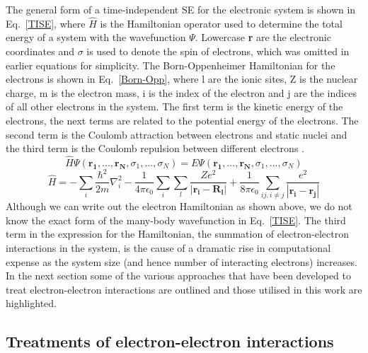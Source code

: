\documentclass[11pt, twoside]{report}
\begin{document}
The general form of a time-independent SE for the electronic system is shown in Eq.~\ref{TISE}, where $\hat{H}$ is the Hamiltonian operator used to determine the total energy of a system with the wavefunction $\Psi$. Lowercase \textbf{r} are the electronic coordinates and $\sigma$ is used to denote the spin of electrons, which was omitted in earlier equations for simplicity. The Born-Oppenheimer Hamiltonian for the electrons is shown in Eq.~\ref{Born-Opp}, where l are the ionic sites, Z is the nuclear charge, m is the electron mass, i is the index of the electron and j are the indices of all other electrons in the system. The first term is the kinetic energy of the electrons, the next terms are related to the potential energy of the electrons. The second term is the Coulomb attraction between electrons and static nuclei and the third term is the Coulomb repulsion between different electrons \cite{Prasad_ch2}.
\begin{equation}\label{TISE}
\hat{H}\Psi(\mathbf{r_1}, ..., \mathbf{r_N}, \sigma_1, ..., \sigma_N) = E\Psi(\mathbf{r_1}, ..., \mathbf{r_N}, \sigma_1, ..., \sigma_N)
\end{equation}
\begin{equation}\label{Born-Opp}
\hat{H} = - \sum_i \frac{\hbar^2}{2m}\nabla_i^2 - \frac{1}{4 \pi \epsilon_0}\sum_i \sum_l \frac{Ze^2}{|\mathbf{r_i}-\mathbf{R_l}|} + \frac{1}{8 \pi \epsilon_0} \sum_{ij, i \neq j}\frac{e^2}{|\mathbf{r_i}-\mathbf{r_j}|}
\end{equation}
Although we can write out the electron Hamiltonian as shown above, we do not know the exact form of the many-body wavefunction in Eq.~\ref{TISE}. The third term in the expression for the Hamiltonian, the summation of electron-electron interactions in the system, is the cause of a dramatic rise in computational expense as the system size (and hence number of interacting electrons) increases. In the next section some of the various approaches that have been developed to treat electron-electron interactions are outlined and those utilised in this work are highlighted.


\subsection{Treatments of electron-electron interactions}
\end{document}
